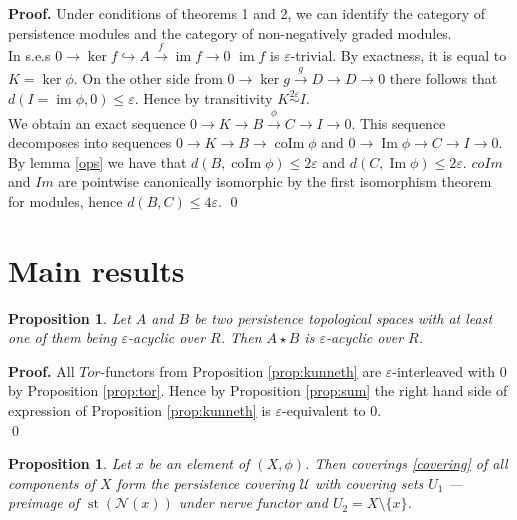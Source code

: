 \documentclass[a4paper, 12pt]{article}
\newcounter{stmcounter}[section]
\numberwithin{equation}{section}
\newtheorem{proposition}[stmcounter]{Proposition}
\theoremstyle{definition}
\theoremstyle{remark}
\newenvironment{pf}{\noindent\textbf{Proof.}}{\qed}
\renewcommand{\leq}{\leqslant}
\begin{document}
\begin{pf}
  Under conditions of theorems 1 and 2, we can identify the category of persistence modules and the category of non-negatively graded modules.\\

  In s.e.s $0 \to \ker{f} \hookrightarrow A \xrightarrow{f} \operatorname{im}f \to 0$ $\operatorname{im}f$ is $\varepsilon$-trivial. By exactness, it is equal to $K = \ker \phi$. On the other side from $0 \to \ker{g} \xrightarrow{g} D \to D \to 0$ there follows that $d(I = \operatorname{im} \phi, 0) \leq \varepsilon$. Hence by transitivity $K \stackrel{2\varepsilon}{\sim} I$.\\

  We obtain an exact sequence $0 \to K \to B \xrightarrow{\phi} C \to I \to 0$. This sequence decomposes into sequences $0 \to K \to B \to \operatorname{coIm}\phi$ and $0 \to \operatorname{Im}\phi \to C \to I \to 0$. By lemma \ref{ops} we have that $d(B,\operatorname{coIm}\phi) \leq 2\varepsilon$ and $d(C,\operatorname{Im}\phi) \leq 2\varepsilon$. $coIm$ and $Im$ are pointwise canonically isomorphic by the first isomorphism theorem for modules, hence $d(B, C) \leq 4\varepsilon$.
\end{pf}\\

\section{Main results}

\begin{proposition}
  \label{prop:acyclic}
  Let $A$ and $B$ be two persistence topological spaces with at least one of them being $\varepsilon$-acyclic over $R$. Then $A \star B$ is $\varepsilon$-acyclic over $R$.
\end{proposition}

\begin{pf}
  All $Tor$-functors from Proposition \ref{prop:kunneth} are $\varepsilon$-interleaved with $0$ by Proposition \ref{prop:tor}. Hence by Proposition \ref{prop:sum} the right hand side of expression of Proposition \ref{prop:kunneth} is $\varepsilon$-equivalent to $0$.\\
\end{pf}\\

\begin{proposition}
  Let $x$ be an element of $(X,\phi)$. Then coverings \eqref{covering} of all components of $X$ form the persistence covering $\mathcal{U}$ with covering sets $U_1$ --- preimage of $\operatorname{st}(\mathcal{N}(x))$ under nerve functor and $U_2 = X \setminus \{x\}$.
\end{proposition}
\end{document}

